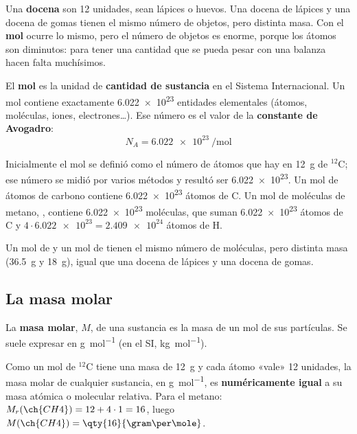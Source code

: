 Una \textbf{docena} son 12 unidades, sean lápices o huevos. Una docena de lápices y una docena de gomas tienen el mismo número
de objetos, pero distinta masa. Con el \textbf{mol} ocurre lo mismo, pero el número de objetos es enorme, porque los átomos son
diminutos: para tener una cantidad que se pueda pesar con una balanza hacen falta muchísimos.

\begin{definition}[Mol]
    El \textbf{mol} es la unidad de \textbf{cantidad de sustancia} en el Sistema Internacional. Un mol contiene exactamente
    \num{6.022e23} entidades elementales (átomos, moléculas, iones, electrones…). Ese número es el valor de la
    \textbf{constante de Avogadro}:
    \[ N_A = \qty{6.022e23}{\per\mole} \]
\end{definition}

Inicialmente el mol se definió como el número de átomos que hay en \qty{12}{\gram} de \(^{12}\)C; ese número se midió por
varios métodos y resultó ser \num{6.022e23}. Un mol de átomos de carbono contiene \num{6.022e23} átomos de C. Un mol de
moléculas de metano, , contiene \num{6.022e23} moléculas, que suman \num{6.022e23} átomos de C y
\(4 \cdot \num{6.022e23} = \num{2.409e24}\) átomos de H.

\begin{remark}
    Un mol de  y un mol de  tienen el mismo número de moléculas, pero distinta masa (\qty{36.5}{\gram} y
    \qty{18}{\gram}), igual que una docena de lápices y una docena de gomas.
\end{remark}

\subsection{La masa molar}

\begin{definition}
    La \textbf{masa molar}, \(M\), de una sustancia es la masa de un mol de sus partículas. Se suele expresar en
    \unit{\gram\per\mole} (en el SI, \unit{\kilogram\per\mole}).
\end{definition}

Como un mol de \(^{12}\)C tiene una masa de \qty{12}{\gram} y cada átomo «vale» 12 unidades, la masa molar de cualquier
sustancia, en \unit{\gram\per\mole}, es \textbf{numéricamente igual} a su masa atómica o molecular relativa. Para el metano:
\(M_r(\ch{CH4}) = 12 + 4 \cdot 1 = 16\), luego \(M(\ch{CH4}) = \qty{16}{\gram\per\mole}\).

